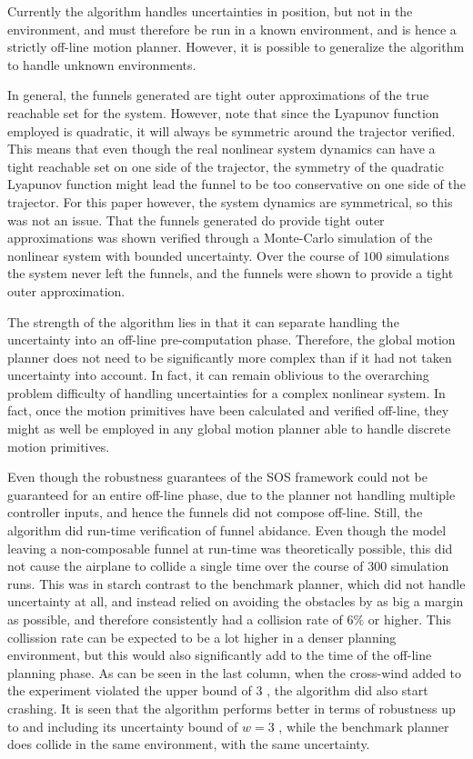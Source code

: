 
Currently the algorithm handles uncertainties in position, but not in the
environment, and must therefore be run in a known environment, and is hence a
strictly off-line motion planner. However, it is possible to generalize the
algorithm to handle unknown environments.

In general, the funnels generated are tight outer approximations of the true
reachable set for the system. However, note that since the Lyapunov function
employed is quadratic, it will always be symmetric around the trajector
verified. This means that even though the real nonlinear system dynamics can
have a tight reachable set on one side of the trajector, the symmetry of the
quadratic Lyapunov function might lead the funnel to be too conservative on one
side of the trajector. For this paper however, the system dynamics are
symmetrical, so this was not an issue. That the funnels generated do provide
tight outer approximations was shown verified through a Monte-Carlo simulation
of the nonlinear system with bounded uncertainty. Over the course of \(100\)
simulations the system never left the funnels, and the funnels were shown to
provide a tight outer approximation.


The strength of the algorithm lies in that it can separate handling the
uncertainty into an off-line pre-computation phase. Therefore, the global motion
planner does not need to be significantly more complex than if it had not
taken uncertainty into account. In fact, it can remain oblivious to the
overarching problem difficulty of handling uncertainties for a complex nonlinear
system. In fact, once the motion primitives have been calculated and verified
off-line, they might as well be employed in any global motion planner able to
handle discrete motion primitives.


Even though the robustness guarantees of the SOS framework could not be
guaranteed for an entire off-line phase, due to the planner not handling
multiple controller inputs, and hence the funnels did not compose off-line.
Still, the \rrtfunnel{} algorithm did run-time verification of funnel abidance.
Even though the model leaving a non-composable funnel at run-time was
theoretically possible, this did not cause the airplane to collide a single time
over the course of \(300\) simulation runs. This was in starch contrast to the
benchmark planner, which did not handle uncertainty at all, and instead relied
on avoiding the obstacles by as big a margin as possible, and therefore
consistently had a collision rate of \(6\%\) or higher. This collission rate can
be expected to be a lot higher in a denser planning environment, but this would
also significantly add to the time of the off-line planning phase. As can be
seen in the last column, when the cross-wind added to the experiment violated
the upper bound of \(3\) , the \rrtfunnel{} algorithm did also
start crashing. It is seen that the
\rrtfunnel{} algorithm performs better in terms of robustness up to and
including its uncertainty bound of \( w = 3 \) , while the
benchmark planner does collide in the same environment, with the same
uncertainty.

